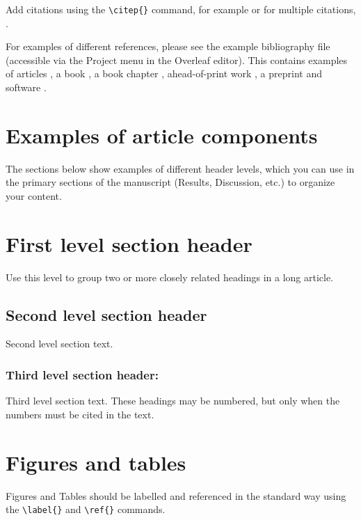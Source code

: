 \documentclass[9pt,twocolumn,twoside,lineno]{gsag3jnl}
\begin{document}
Add citations using the \verb|\citep{}| command, for example \citep{neher2013genealogies} or for multiple citations, \citep{neher2013genealogies, rodelsperger2014characterization}.

For examples of different references, please see the example bibliography file (accessible via the Project menu in the Overleaf editor). This contains examples of articles \citep{neher2013genealogies, rodelsperger2014characterization}, a book \citep{Sturtevent2001}, a book chapter \citep{Sturtevent2001chp7}, ahead-of-print work \citep{Starita2015}, a preprint \citep{Falush16} and software \citep{Kruijer2015}.

\section{Examples of article components}
\label{sec:examples}

The sections below show examples of different header levels, which you can use in the primary sections of the manuscript (Results, Discussion, etc.) to organize your content.

\section{First level section header}

Use this level to group two or more closely related headings in a long article.

\subsection{Second level section header}

Second level section text.

\subsubsection{Third level section header:}

Third level section text. These headings may be numbered, but only when the numbers must be cited in the text.

\section{Figures and tables}

Figures and Tables should be labelled and referenced in the standard way using the \verb|\label{}| and \verb|\ref{}| commands.
\end{document}
